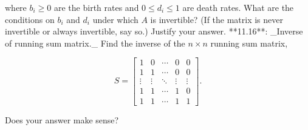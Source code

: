 where \(b_{i}\geq 0\) are the birth rates and \(0\leq d_{i}\leq 1\) are death rates. What are the conditions on \(b_{i}\) and \(d_{i}\) under which \(A\) is invertible? (If the matrix is never invertible or always invertible, say so.) Justify your answer.
**11.16**: _Inverse of running sum matrix._ Find the inverse of the \(n\times n\) running sum matrix,

\[S=\left[\begin{array}{cccccc}1&0&\cdots&0&0\\ 1&1&\cdots&0&0\\ \vdots&\vdots&\ddots&\vdots&\vdots\\ 1&1&\cdots&1&0\\ 1&1&\cdots&1&1\end{array}\right].\]

Does your answer make sense?
